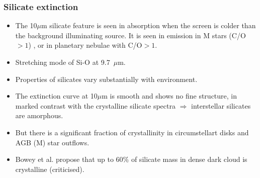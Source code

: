 \begin{frame}\frametitle{Silicate extinction}

\begin{itemize}
\item The 10$\mu$m silicate feature is seen in absorption when the
  screen is colder than the background illuminating source. It is seen
  in emission in M stars (C/O$>1$) , or in planetary nebulae with
  C/O$>1$.

\item Stretching  mode of  Si-O at 9.7~$\mu$m. 

\item Properties of silicates vary substantially with environment.

\item The extinction curve at  10$\mu$m is smooth and shows no fine
structure, in marked contrast with the crystalline silicate spectra
$\Rightarrow$ interstellar silicates are amorphous.

\item But there is a significant fraction of crystallinity in
circumstellart disks and AGB (M) star outflows.

\item Bowey et al. propose that up to  60\% of  silicate mass in dense
dark cloud is crystalline (criticised). 
\end{itemize}

 
\end{frame}
